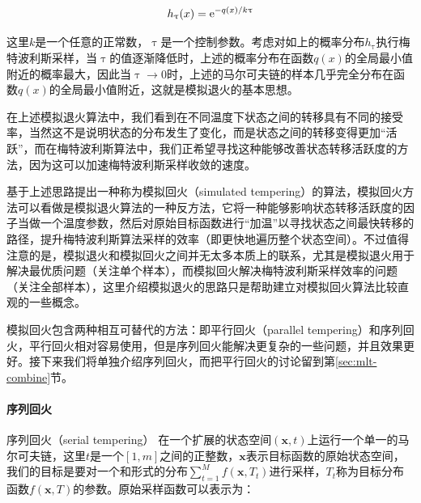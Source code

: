 \begin{equation}
	h_{\uptau}(x)={\rm e}^{-q(x)/k\uptau}
\end{equation}

\noindent 这里$k$是一个任意的正常数，$\uptau$是一个控制参数。考虑对如上的概率分布$h_{\uptau}$执行梅特波利斯采样，当$\uptau$的值逐渐降低时，上述的概率分布在函数$q(x)$的全局最小值附近的概率最大，因此当$\uptau\to 0$时，上述的马尔可夫链的样本几乎完全分布在函数$q(x)$的全局最小值附近，这就是模拟退火的基本思想。

在上述模拟退火算法中，我们看到在不同温度下状态之间的转移具有不同的接受率，当然这不是说明状态的分布发生了变化，而是状态之间的转移变得更加“活跃”，而在梅特波利斯算法中，我们正希望寻找这种能够改善状态转移活跃度的方法，因为这可以加速梅特波利斯采样收敛的速度。

\cite{a:SimulatedTempering:ANewMonteCarloScheme}基于上述思路提出一种称为模拟回火（simulated tempering）的算法，模拟回火方法可以看做是模拟退火算法的一种反方法，它将一种能够影响状态转移活跃度的因子当做一个温度参数，然后对原始目标函数进行“加温”以寻找状态之间最快转移的路径，提升梅特波利斯算法采样的效率（即更快地遍历整个状态空间）。不过值得注意的是，模拟退火和模拟回火之间并无太多本质上的联系，尤其是模拟退火用于解决最优质问题（关注单个样本），而模拟回火解决梅特波利斯采样效率的问题（关注全部样本），这里介绍模拟退火的思路只是帮助建立对模拟回火算法比较直观的一些概念。

模拟回火包含两种相互可替代的方法：即平行回火（parallel tempering）和序列回火，平行回火\cite{a:markovchainmontecarlomaximumlikelihoodfordependentdata}相对容易使用，但是序列回火能解决更复杂的一些问题，并且效果更好。接下来我们将单独介绍序列回火，而把平行回火的讨论留到第\ref{sec:mlt-combine}节。




\paragraph{序列回火}
序列回火（serial tempering）
\cite{a:SimulatedTempering:ANewMonteCarloScheme,a:AnnealingMarkovChainMonteCarlowithApplicationstoAncestralInference,b:HandbookofMarkovChainMonteCarlo}在一个扩展的状态空间$(\mathbf{x},t)$上运行一个单一的马尔可夫链，这里$t$是一个$[1,m]$之间的正整数，$\mathbf{x}$表示目标函数的原始状态空间，我们的目标是要对一个和形式的分布$\sum^{M}_{t=1}f(\mathbf{x},T_t)$进行采样，$T_t$称为目标分布函数$f(\mathbf{x},T)$的参数。原始采样函数可以表示为：

